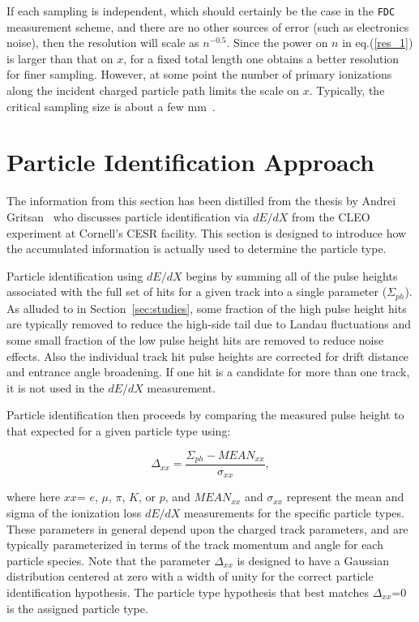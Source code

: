 \documentclass[12pt]{article}
\begin{document}
If each sampling is independent, which should certainly be the case in
the {\tt FDC} measurement scheme, and there are no other sources of error
(such as electronics noise), then the resolution will scale as $n^{-0.5}$.
Since the power on $n$ in eq.(\ref{res_1}) is larger than that on $x$,
for a fixed total length one obtains a better resolution for finer
sampling.  However, at some point the number of primary ionizations along
the incident charged particle path limits the scale on $x$.  Typically,
the critical sampling size is about a few mm~\cite{yamamoto}.

\section{Particle Identification Approach}

The information from this section has been distilled from the thesis
by Andrei Gritsan~\cite{gritsan} who discusses particle identification
via $dE/dX$ from the CLEO experiment at Cornell's CESR facility.  This
section is designed to introduce how the accumulated information is
actually used to determine the particle type.

Particle identification using $dE/dX$ begins by summing all of the pulse
heights associated with the full set of hits for a given track into 
a single parameter ($\Sigma_{ph}$).  As alluded to in Section~\ref{sec:studies},
some fraction of the high pulse height hits are typically removed to
reduce the high-side tail due to Landau fluctuations and some small
fraction of the low pulse height hits are removed to reduce noise effects.
Also the individual track hit pulse heights are corrected
for drift distance and entrance angle broadening.  If one hit is
a candidate for more than one track, it is not used in the $dE/dX$
measurement.

Particle identification then proceeds by comparing the measured pulse
height to that expected for a given particle type using:

\begin{equation}
\Delta_{xx} = \frac{\Sigma_{ph} - MEAN_{xx}}{\sigma_{xx}},
\end{equation}

\noindent
where here $xx$= $e$, $\mu$, $\pi$, $K$, or $p$, and $MEAN_{xx}$ and
$\sigma_{xx}$ represent the mean and sigma of the ionization loss $dE/dX$ 
measurements for the specific particle types.  These parameters in general 
depend upon the charged track parameters, and are typically parameterized 
in terms of the track momentum and angle for each particle species.  Note
that the parameter $\Delta_{xx}$ is designed to have a Gaussian
distribution centered at zero with a width of unity for the correct
particle identification hypothesis.  The particle type hypothesis
that best matches $\Delta_{xx}$=0 is the assigned particle type.
\end{document}
